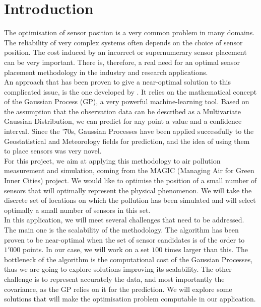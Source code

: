 \chapter{Introduction}



The optimisation of sensor position is a very common problem in many domains. The reliability of very complex systems often depends on the choice of sensor position. The cost induced by an incorrect or supernumerary sensor placement can be very important. There is, therefore, a real need for an optimal sensor placement methodology in the industry and research applications. \\

An approach that has been proven to give a near-optimal solution to this complicated issue, is the one developed by \citet{krause_near-optimal_2008}. It relies on the mathematical concept of the Gaussian Process (GP), a very powerful machine-learning tool. Based on the assumption that the observation data can be described as a Multivariate Gaussian Distribution, we can predict for any point a value and a confidence interval. Since the '70s, Gaussian Processes have been applied successfully to the Geostatistical and Meteorology fields for prediction, and the idea of using them to place sensors was very novel. \\

For this project, we aim at applying this methodology to air pollution measurement and simulation, coming from the MAGIC (Managing Air for Green Inner Cities) project. We would like to optimise the position of a small number of sensors that will optimally represent the physical phenomenon. We will take the discrete set of locations on which the pollution has been simulated and will select optimally a small number of sensors in this set. \\

In this application, we will meet several challenges that need to be addressed. The main one is the scalability of the methodology. The algorithm has been proven to be near-optimal when the set of sensor candidates is of the order to $1'000$ points. In our case, we will work on a set $100$ times larger than this. The bottleneck of the algorithm is the computational cost of the Gaussian Processes, thus we are going to explore solutions improving its scalability. The other challenge is to represent accurately the data, and most importantly the covariance, as the GP relies on it for the prediction. We will explore some solutions that will make the optimisation problem computable in our application. \\

